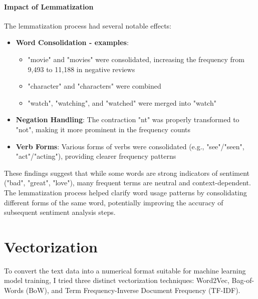\documentclass[12pt]{article}
\begin{document}
\paragraph{Impact of Lemmatization}
The lemmatization process had several notable effects:
\begin{itemize}
    \item \textbf{Word Consolidation - examples}: 
        \begin{itemize}
            \item "movie" and "movies" were consolidated, increasing the frequency from 9,493 to 11,188 in negative reviews
            \item "character" and "characters" were combined
            \item "watch", "watching", and "watched" were merged into "watch"
        \end{itemize}
    
    \item \textbf{Negation Handling}: The contraction "nt" was properly transformed to "not", making it more prominent in the frequency counts
    
    \item \textbf{Verb Forms}: Various forms of verbs were consolidated (e.g., "see"/"seen", "act"/"acting"), providing clearer frequency patterns
\end{itemize}

These findings suggest that while some words are strong indicators of sentiment ("bad", "great", "love"), many frequent terms are neutral and context-dependent. The lemmatization process helped clarify word usage patterns by consolidating different forms of the same word, potentially improving the accuracy of subsequent sentiment analysis steps.






\section{Vectorization}
To convert the text data into a numerical format suitable for machine learning model training, I tried three distinct vectorization techniques: Word2Vec, Bag-of-Words (BoW), and Term Frequency-Inverse Document Frequency (TF-IDF).
\end{document}
